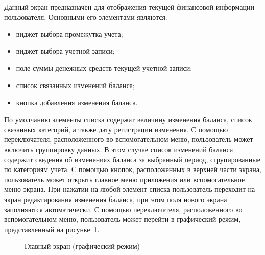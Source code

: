 Данный экран предназначен для отображения текущей финансовой
информации пользователя. Основными его элементами являются:
\begin{itemize}
\item виджет выбора промежутка учета;
\item виджет выбора учетной записи;
\item поле суммы денежных средств текущей учетной записи;
\item список связанных изменений баланса;
\item кнопка добавления изменения баланса.
\end{itemize}

По умолчанию элементы списка содержат величину изменения баланса,
список связанных категорий, а также дату регистрации изменения.
С помощью переключателя, расположенного во вспомогательном меню,
пользователь может включить группировку данных.
В этом случае список изменений баланса содержит сведения
об изменениях баланса за выбранный период,
сгрупированные по категориям учета.
С помощью кнопок, расположенных в верхней части экрана, пользователь
может открыть главное меню приложения или вспомогательное меню экрана.
При нажатии на любой элемент списка пользователь переходит
на экран редактирования изменения баланса,
при этом поля нового экрана заполняются автоматически.
С помощью переключателя, расположенного во вспомогательном меню,
пользователь может перейти в графический режим, представленный
на рисунке~\ref{fig:implementation_ui_activity_balance_graphic}.

\begin{figure}[h!]
  \centering
  \caption{Главный экран (графический режим)}
  \label{fig:implementation_ui_activity_balance_graphic}
\end{figure}


